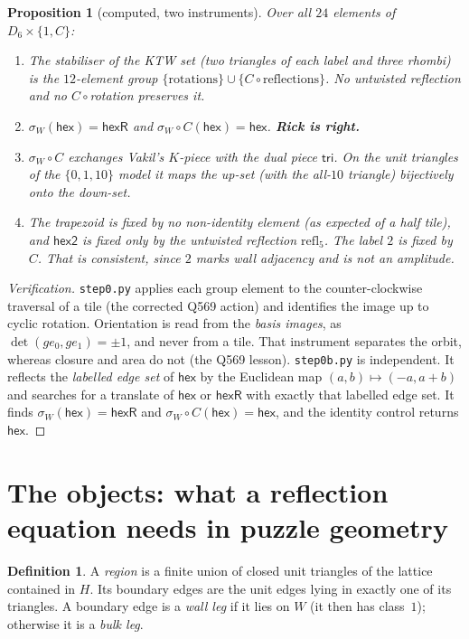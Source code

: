\documentclass[11pt]{article}
\newtheorem{proposition}[theorem]{Proposition}
\theoremstyle{definition}
\newtheorem{definition}[theorem]{Definition}
\newcommand{\hex}{\mathsf{hex}}
\newcommand{\hexR}{\mathsf{hexR}}
\begin{document}
\begin{proposition}[computed, two instruments]\label{prop:step0}
Over all $24$ elements of $D_6\times\{1,C\}$:
\begin{enumerate}
\item The stabiliser of the KTW set (two triangles of each label and three rhombi) is the
$12$-element group $\{\text{rotations}\}\cup\{C\circ\text{reflections}\}$. No untwisted reflection and
no $C\circ$rotation preserves it.
\item $\sigma_W(\hex)=\hexR$ and $\sigma_W\circ C(\hex)=\hex$. \textbf{Rick is right.}
\item $\sigma_W\circ C$ exchanges Vakil's $K$-piece with the dual piece $\mathsf{tri}$. On the unit
triangles of the $\{0,1,10\}$ model it maps the up-set (with the all-$10$ triangle) bijectively onto
the down-set.
\item The trapezoid is fixed by no non-identity element (as expected of a half tile), and
$\mathsf{hex2}$ is fixed only by the \emph{untwisted} reflection $\mathrm{refl}_5$. The label $2$
is fixed by $C$. That is consistent, since $2$ marks wall adjacency and is not an amplitude.
\end{enumerate}
\end{proposition}
\begin{proof}[Verification]
\texttt{step0.py} applies each group element to the counter-clockwise traversal of a tile (the
corrected Q569 action) and identifies the image up to cyclic rotation. Orientation is read from
the \emph{basis images}, as $\det(g e_0, g e_1)=\pm1$, and never from a tile. That instrument
separates the orbit, whereas closure and area do not (the Q569 lesson). \texttt{step0b.py} is
independent. It reflects the \emph{labelled edge set} of $\hex$ by the Euclidean map
$(a,b)\mapsto(-a,a+b)$ and searches for a translate of $\hex$ or $\hexR$ with exactly that labelled
edge set. It finds $\sigma_W(\hex)=\hexR$ and $\sigma_W\circ C(\hex)=\hex$, and the identity control
returns $\hex$.
\end{proof}

\section{The objects: what a reflection equation needs in puzzle geometry}

\begin{definition}
A \emph{region} is a finite union of closed unit triangles of the lattice contained in $H$.
Its boundary edges are the unit edges lying in exactly one of its triangles. A boundary edge is a
\emph{wall leg} if it lies on $W$ (it then has class~$1$); otherwise it is a \emph{bulk leg}.
\end{definition}
\end{document}
